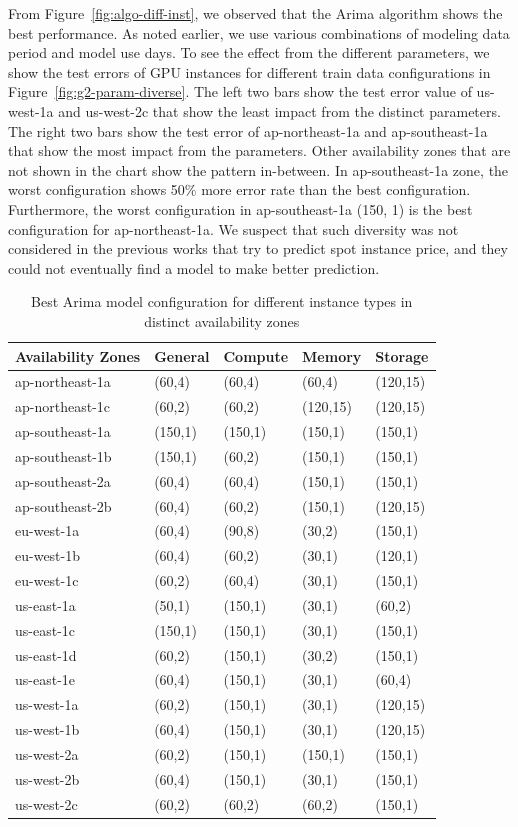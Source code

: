 \documentclass[graybox]{svmult}
\begin{document}
From Figure~\ref{fig:algo-diff-inst}, we observed that the Arima algorithm shows the best performance. As noted earlier, we use various combinations of modeling data period and model use days. To see the effect from the different parameters, we show the test errors of GPU instances for different train data configurations in Figure~\ref{fig:g2-param-diverse}. The left two bars show the test error value of us-west-1a and us-west-2c that show the least impact from the distinct parameters. The right two bars show the test error of ap-northeast-1a and ap-southeast-1a that show the most impact from the parameters. Other availability zones that are not shown in the chart show the pattern in-between. In ap-southeast-1a zone, the worst configuration shows 50\% more error rate than the best configuration. Furthermore, the worst configuration in ap-southeast-1a (150, 1) is the best configuration for ap-northeast-1a. We suspect that such diversity was not considered in the previous works that try to predict spot instance price, and they could not eventually find a model to make better prediction. 
\begin{table}
  \begin{tabular}{ |C{2.5cm}||C{2cm}||C{2cm}||C{2cm}||C{2cm}|}
\hline
\small
\textbf{Availability Zones} &\textbf{General}&\textbf{Compute}&\textbf{Memory}&\textbf{Storage}\\\hline
ap-northeast-1a& (60,4)&(60,4)&(60,4)&(120,15)\\
ap-northeast-1c&(60,2)&(60,2)&(120,15)&(120,15)\\
ap-southeast-1a&(150,1)&(150,1)&(150,1)&(150,1)\\
ap-southeast-1b&(150,1)&(60,2)&(150,1)&(150,1)\\
ap-southeast-2a&(60,4)&(60,4)&(150,1)&(150,1)\\
ap-southeast-2b&(60,4)&(60,2)&(150,1)&(120,15)\\
eu-west-1a&(60,4)&(90,8)&(30,2)&(150,1)\\
eu-west-1b&(60,4)&(60,2)&(30,1)&(120,1)\\
eu-west-1c&(60,2)&(60,4)&(30,1)&(150,1)\\
us-east-1a&(50,1)&(150,1)&(30,1)&(60,2)\\
us-east-1c&(150,1)&(150,1)&(30,1)&(150,1)\\
us-east-1d&(60,2)&(150,1)&(30,2)&(150,1)\\
us-east-1e&(60,4)&(150,1)&(30,1)&(60,4)\\
us-west-1a&(60,2)&(150,1)&(30,1)&(120,15)\\
us-west-1b&(60,4)&(150,1)&(30,1)&(120,15)\\
us-west-2a&(60,2)&(150,1)&(150,1)&(150,1)\\
us-west-2b&(60,4)&(150,1)&(30,1)&(150,1)\\
us-west-2c&(60,2)&(60,2)&(60,2)&(150,1)\\\hline
\end{tabular}
\caption{Best Arima model configuration for different instance types in distinct availability zones}
\label{table:best-arima-config}
\end{table}
\end{document}

